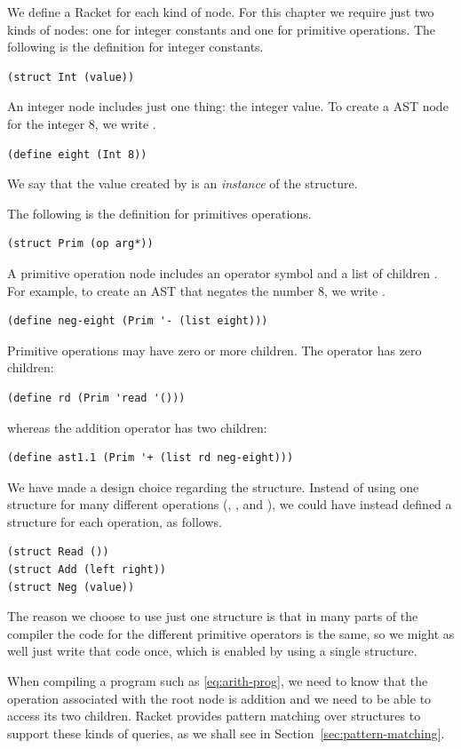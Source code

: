 \documentclass[11pt]{book}
\begin{document}
We define a Racket  for each kind of node. For this
chapter we require just two kinds of nodes: one for integer constants
and one for primitive operations. The following is the 
definition for integer constants.
\begin{lstlisting}
(struct Int (value))
\end{lstlisting}
An integer node includes just one thing: the integer value.
To create a AST node for the integer $8$, we write .
\begin{lstlisting}
(define eight (Int 8))
\end{lstlisting}
We say that the value created by  is an
\emph{instance} of the  structure.

The following is the  definition for primitives operations.
\begin{lstlisting}
(struct Prim (op arg*))
\end{lstlisting}
A primitive operation node includes an operator symbol 
and a list of children . For example, to create
an AST that negates the number $8$, we write .
\begin{lstlisting}
(define neg-eight (Prim '- (list eight)))
\end{lstlisting}
Primitive operations may have zero or more children. The 
operator has zero children:
\begin{lstlisting}
(define rd (Prim 'read '()))
\end{lstlisting}
whereas the addition operator has two children:
\begin{lstlisting}
(define ast1.1 (Prim '+ (list rd neg-eight)))
\end{lstlisting}

We have made a design choice regarding the  structure.
Instead of using one structure for many different operations
(, \code{+}, and \code{-}), we could have instead defined a
structure for each operation, as follows.
\begin{lstlisting}
(struct Read ())
(struct Add (left right))
(struct Neg (value))
\end{lstlisting}
The reason we choose to use just one structure is that in many parts
of the compiler the code for the different primitive operators is the
same, so we might as well just write that code once, which is enabled
by using a single structure.

When compiling a program such as \eqref{eq:arith-prog}, we need to
know that the operation associated with the root node is addition and
we need to be able to access its two children. Racket provides pattern
matching over structures to support these kinds of queries, as we
shall see in Section~\ref{sec:pattern-matching}.
\end{document}
